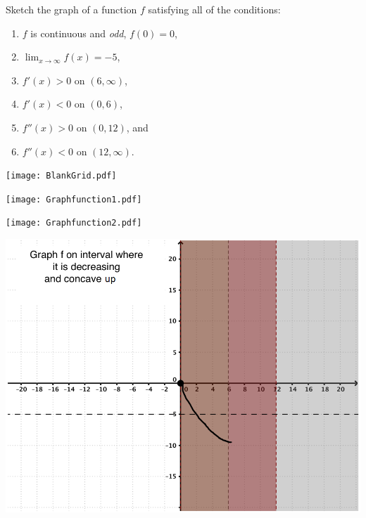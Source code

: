 \documentclass[nooutcomes]{ximera}
\begin{document}
\begin{problem}

  Sketch the graph of a function $f$ satisfying all of the conditions:
  \begin{enumerate}
    \item
      $f$ is continuous and \emph{odd}, $f(0) = 0$,

    \item
      $\displaystyle \lim_{x \to \infty} f(x) = -5$,

    \item
      $f'(x) > 0$ on $(6, \infty)$,

    \item
      $f'(x) < 0$ on $(0, 6)$,

    \item
      $f''(x) > 0$ on $(0, 12)$, and
      
    \item
      $f''(x) < 0$ on $(12, \infty)$.
  \end{enumerate}

    \begin{image}
      \texttt{[image: BlankGrid.pdf]}
    \end{image}

  \begin{freeResponse} \hfil
    \begin{image}
      \texttt{[image: Graphfunction1.pdf]}
    \end{image}
    \begin{image}
      \texttt{[image: Graphfunction2.pdf]}
    \end{image}

    \begin{image}
      \includegraphics[scale = 0.35]{Graphfunction4.png}
    \end{image}


\end{freeResponse}
\end{problem}
\end{document}
